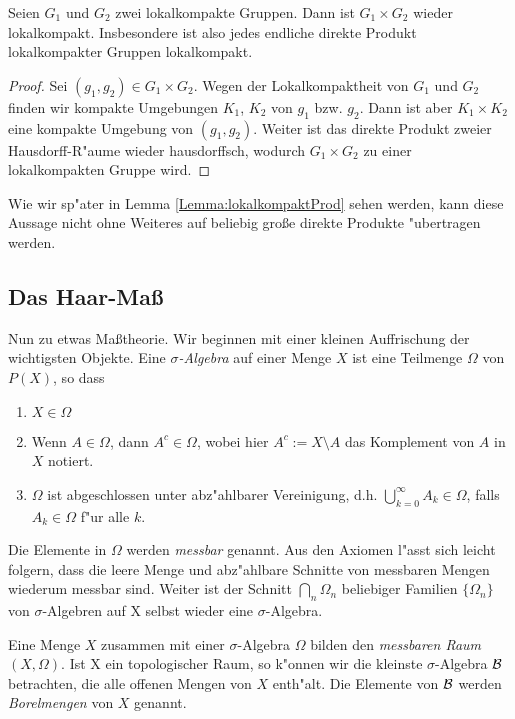	\begin{lemma}
		Seien $G_1$ und $G_2$ zwei lokalkompakte Gruppen. Dann ist $G_1\times G_2$ wieder lokalkompakt. Insbesondere ist also jedes endliche direkte Produkt lokalkompakter Gruppen lokalkompakt.
	\end{lemma}
	\begin{proof}
		Sei $(g_1,g_2) \in G_1\times G_2$. Wegen der Lokalkompaktheit von $G_1$ und $G_2$ finden wir kompakte Umgebungen $K_1$, $K_2$ von $g_1$ bzw. $g_2$. Dann ist aber $K_1 \times K_2$ eine kompakte Umgebung von $(g_1,g_2)$. Weiter ist das direkte Produkt zweier Hausdorff-R"aume wieder hausdorffsch, wodurch $G_1\times G_2$ zu einer lokalkompakten Gruppe wird.
	\end{proof}
	Wie wir sp"ater in Lemma \ref{Lemma:lokalkompaktProd} sehen werden, kann diese Aussage nicht ohne Weiteres auf beliebig gro\ss e direkte Produkte "ubertragen werden.

\subsection{Das Haar-Maß}
	Nun zu etwas Maßtheorie. Wir beginnen mit einer kleinen Auffrischung der wichtigsten Objekte. 
	Eine \emph{$\sigma$-Algebra} auf einer Menge $X$ ist eine Teilmenge $\Omega$ von $P(X)$, so dass
	\begin{enumerate}[label=(\roman*)]
		\item $X \in \Omega$
		\item Wenn $A \in \Omega$, dann $A^c \in \Omega$, wobei hier $A^c := X\setminus A$ das Komplement von $A$ in $X$ notiert.
		\item $\Omega$ ist abgeschlossen unter abz"ahlbarer Vereinigung, d.h. $\bigcup_{k=0}^{\infty} A_k \in \Omega$, falls $A_k \in \Omega$ f"ur alle $k$.
	\end{enumerate}
	Die Elemente in $\Omega$ werden \emph{messbar} genannt. 
	Aus den Axiomen l"asst sich leicht folgern, dass die leere Menge und abz"ahlbare Schnitte von messbaren Mengen wiederum messbar sind. 
	Weiter ist der Schnitt $\bigcap_n \Omega_n$ beliebiger Familien $\{\Omega_n\}$ von $\sigma$-Algebren auf X selbst wieder eine $\sigma$-Algebra.
	
	
	Eine Menge $X$ zusammen mit einer $\sigma$-Algebra $\Omega$ bilden den \emph{messbaren Raum} $(X, \Omega)$. 
	Ist X ein topologischer Raum, so k"onnen wir die kleinste $\sigma$-Algebra $\mathcal{B}$ betrachten, die alle offenen Mengen von $X$ enth"alt. 
	Die Elemente von $\mathcal{B}$ werden \emph{Borelmengen} von $X$ genannt.
	
